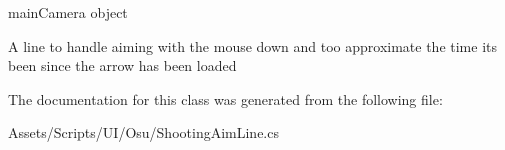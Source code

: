 main\+Camera object 

A line to handle aiming with the mouse down and too approximate the time it\textquotesingle{}s been since the arrow has been loaded 

The documentation for this class was generated from the following file\+:\begin{DoxyCompactItemize}
\item 
Assets/\+Scripts/\+U\+I/\+Osu/Shooting\+Aim\+Line.\+cs\end{DoxyCompactItemize}
